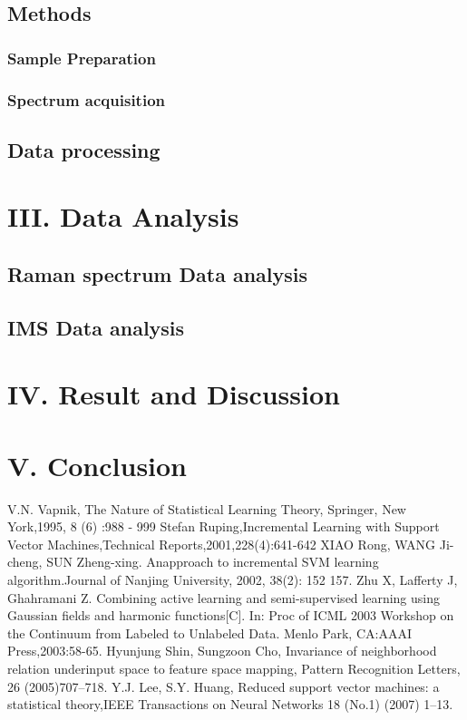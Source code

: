 \documentclass[a4paper]{article}
\begin{document}
\subsection{Methods}
\subsubsection{Sample Preparation}
\subsubsection{Spectrum acquisition}

\subsection{Data processing}


\section{III. Data Analysis}
\subsection{Raman spectrum Data analysis}
\subsection{IMS Data analysis}

\section{IV. Result and Discussion}


\section{V.	Conclusion}


\renewcommand\refname{References}
\begin{thebibliography}{99}
    V.N. Vapnik, The Nature of Statistical Learning Theory, Springer, New York,1995, 8 (6) :988 - 999
    Stefan Ruping,Incremental Learning with Support Vector Machines,Technical Reports,2001,228(4):641-642
    XIAO Rong, WANG Ji-cheng, SUN Zheng-xing. Anapproach to incremental SVM learning algorithm.Journal of Nanjing University, 2002, 38(2): 152 157.
    Zhu X, Lafferty J, Ghahramani Z. Combining active learning and semi-supervised learning using Gaussian fields  and  harmonic  functions[C].  In:  Proc  of  ICML  2003  Workshop  on  the  Continuum  from  Labeled  to Unlabeled Data. Menlo Park, CA:AAAI Press,2003:58-65.
    Hyunjung Shin, Sungzoon Cho, Invariance of neighborhood relation underinput space to feature space mapping, Pattern Recognition Letters, 26 (2005)707–718.
    Y.J. Lee, S.Y. Huang, Reduced support vector machines: a statistical theory,IEEE Transactions on Neural Networks 18 (No.1) (2007) 1–13.
\end{thebibliography}
\end{document}

